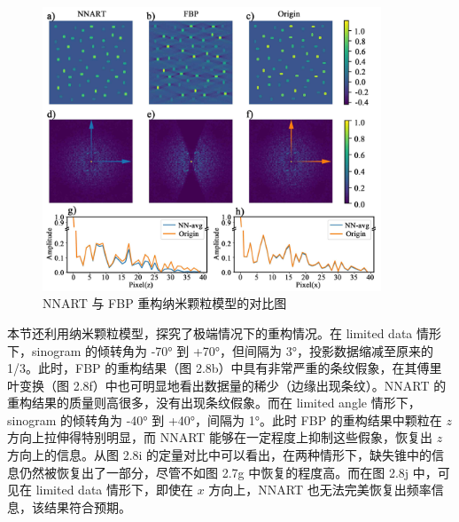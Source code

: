 \begin{figure}[H]
	\vspace{\baselineskip}
	\centering
	\includegraphics[width=0.9\textwidth]{../3.13/313}
	\caption{NNART 与 FBP 重构纳米颗粒模型的对比图}\label{fig:313}
	\song{}
\end{figure}


本节还利用纳米颗粒模型，探究了极端情况下的重构情况。在 limited data 情形下，sinogram 的倾转角为 -70° 到 +70°，但间隔为 3°，投影数据缩减至原来的 1/3。此时，FBP 的重构结果（图 2.8b）中具有非常严重的条纹假象，在其傅里叶变换（图 2.8f）中也可明显地看出数据量的稀少（边缘出现条纹）。NNART 的重构结果的质量则高很多，没有出现条纹假象。而在 limited angle 情形下，sinogram 的倾转角为 -40° 到 +40°，间隔为 1°。此时 FBP 的重构结果中颗粒在 $z$ 方向上拉伸得特别明显，而 NNART 能够在一定程度上抑制这些假象，恢复出 $z$ 方向上的信息。从图 2.8i 的定量对比中可以看出，在两种情形下，缺失锥中的信息仍然被恢复出了一部分，尽管不如图 2.7g 中恢复的程度高。而在图 2.8j 中，可见在 limited data 情形下，即使在 $x$ 方向上，NNART 也无法完美恢复出频率信息，该结果符合预期。


